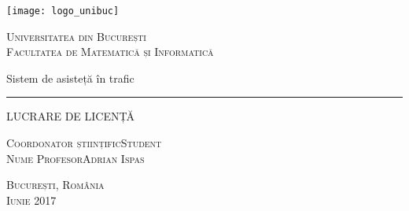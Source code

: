 \begin{titlepage}
	\begin{center}

		\texttt{[image: logo\_unibuc]}

		\vspace{0.5cm}
		\LARGE \textsc{Universitatea din București}
		\\
		\vspace{0.5cm}
		\Large \textsc{Facultatea de Matematică și Informatică}

		\vfill

		\Huge Sistem de asisteță în trafic
		\rule{\textwidth}{1pt}
		\Large LUCRARE DE LICENȚĂ

		\vfill

		\Large
		\textsc{Coordonator științific}\hfill \textsc{Student}
		\\
		\large
		\textsc{Nume Profesor}\hfill \textsc{Adrian Ispas}
	
		\vspace{1.5cm}
		\textsc{București, România}\\
		\textsc{Iunie 2017}

	\end{center}
\end{titlepage}
 

